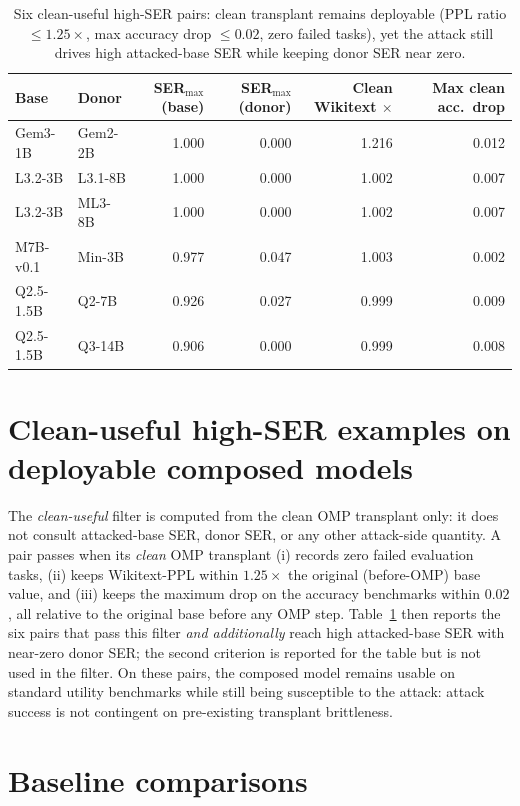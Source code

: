 
\begin{table}[t]
\centering
\small
\caption{Six clean-useful high-SER pairs: clean transplant remains deployable (PPL ratio $\le 1.25\times$, max accuracy drop $\le 0.02$, zero failed tasks), yet the attack still drives high attacked-base SER while keeping donor SER near zero.}
\label{tab:clean-useful}
\begin{tabular}{llrrrr}
\toprule
Base & Donor & SER$_{\max}$(base) & SER$_{\max}$(donor) & Clean Wikitext $\times$ & Max clean acc.\ drop \\
\midrule
Gem3-1B   & Gem2-2B & 1.000 & 0.000 & 1.216 & 0.012 \\
L3.2-3B   & L3.1-8B & 1.000 & 0.000 & 1.002 & 0.007 \\
L3.2-3B   & ML3-8B  & 1.000 & 0.000 & 1.002 & 0.007 \\
M7B-v0.1  & Min-3B  & 0.977 & 0.047 & 1.003 & 0.002 \\
Q2.5-1.5B & Q2-7B   & 0.926 & 0.027 & 0.999 & 0.009 \\
Q2.5-1.5B & Q3-14B  & 0.906 & 0.000 & 0.999 & 0.008 \\
\bottomrule
\end{tabular}
\end{table}

\section{Clean-useful high-SER examples on deployable composed models}
\label{app:clean_useful}

The \emph{clean-useful} filter is computed from the clean OMP transplant only: it does not consult attacked-base SER, donor SER, or any other attack-side quantity. A pair passes when its \emph{clean} OMP transplant (i) records zero failed evaluation tasks, (ii) keeps Wikitext-PPL within $1.25\times$ the original (before-OMP) base value, and (iii) keeps the maximum drop on the accuracy benchmarks within $0.02$, all relative to the original base before any OMP step. Table~\ref{tab:clean-useful} then reports the six pairs that pass this filter \emph{and additionally} reach high attacked-base SER with near-zero donor SER; the second criterion is reported for the table but is not used in the filter.
On these pairs, the composed model remains usable on standard utility benchmarks while still being susceptible to the attack: attack success is not contingent on pre-existing transplant brittleness.

\section{Baseline comparisons}
\label{app:baselines}

